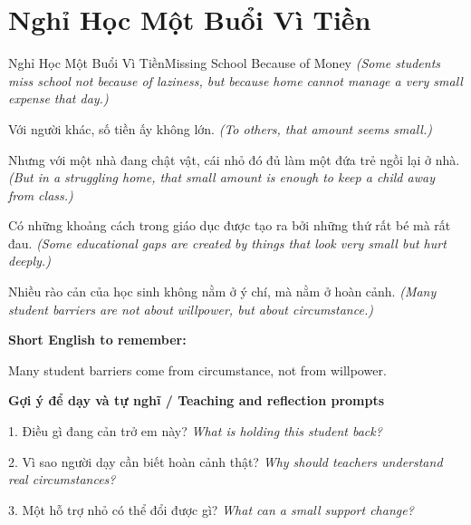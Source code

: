 \section{Nghỉ Học Một Buổi Vì Tiền}
\begin{truyen}{Nghỉ Học Một Buổi Vì Tiền}{Missing School Because of Money}
\textit{(Some students miss school not because of laziness, but because home cannot manage a very small expense that day.)}

Với người khác, số tiền ấy không lớn.
\textit{(To others, that amount seems small.)}

Nhưng với một nhà đang chật vật, cái nhỏ đó đủ làm một đứa trẻ ngồi lại ở nhà.
\textit{(But in a struggling home, that small amount is enough to keep a child away from class.)}

Có những khoảng cách trong giáo dục được tạo ra bởi những thứ rất bé mà rất đau.
\textit{(Some educational gaps are created by things that look very small but hurt deeply.)}

\end{truyen}

\begin{baihoc}
Nhiều rào cản của học sinh không nằm ở ý chí, mà nằm ở hoàn cảnh.
\textit{(Many student barriers are not about willpower, but about circumstance.)}
\end{baihoc}

\begin{ghinhoanh}
\textbf{Short English to remember:}

Many student barriers come from circumstance, not from willpower.

\end{ghinhoanh}

\begin{tuhocnhanh}
\textbf{Gợi ý để dạy và tự nghĩ / Teaching and reflection prompts}

1. Điều gì đang cản trở em này? \textit{What is holding this student back?}

2. Vì sao người dạy cần biết hoàn cảnh thật? \textit{Why should teachers understand real circumstances?}

3. Một hỗ trợ nhỏ có thể đổi được gì? \textit{What can a small support change?}
\end{tuhocnhanh}
\ngancach

